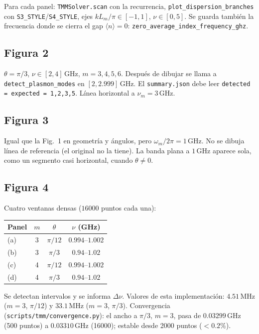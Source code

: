 \documentclass[11pt,a4paper]{article}
\begin{document}
Para cada panel: \texttt{TMMSolver.scan} con la recurrencia,
\texttt{plot\_dispersion\_branches} con \texttt{S3\_STYLE}/\texttt{S4\_STYLE},
ejes \(k L_m/\pi\in[-1,1]\), \(\nu\in[0,5]\).
Se guarda también la frecuencia donde se cierra el gap \(\langle n\rangle=0\):
\texttt{zero\_average\_index\_frequency\_ghz}.

\subsection{Figura 2}

\(\theta=\pi/3\), \(\nu\in[2,4]\,\mathrm{GHz}\), \(m=3,4,5,6\).
Después de dibujar se llama a \texttt{detect\_plasmon\_modes} en
\([2,2.999]\,\mathrm{GHz}\).
El \texttt{summary.json} debe leer \texttt{detected = expected = 1,2,3,5}.
Línea horizontal a \(\nu_m=3\,\mathrm{GHz}\).

\subsection{Figura 3}

Igual que la Fig.~1 en geometría y ángulos, pero
\(\omega_m/2\pi=1\,\mathrm{GHz}\).
No se dibuja línea de referencia (el original no la tiene).
La banda plana a \(1\,\mathrm{GHz}\) aparece sola, como un segmento casi
horizontal, cuando \(\theta\neq 0\).

\subsection{Figura 4}

Cuatro ventanas densas (\(16000\) puntos cada una):

\begin{center}
\begin{tabular}{lccc}
\toprule
Panel & \(m\) & \(\theta\) & \(\nu\) (GHz) \\
\midrule
(a) & 3 & \(\pi/12\) & \(0.994\)--\(1.002\) \\
(b) & 3 & \(\pi/3\) & \(0.94\)--\(1.02\) \\
(c) & 4 & \(\pi/12\) & \(0.994\)--\(1.002\) \\
(d) & 4 & \(\pi/3\) & \(0.94\)--\(1.02\) \\
\bottomrule
\end{tabular}
\end{center}

Se detectan intervalos y se informa \(\Delta\nu\).
Valores de esta implementación: \(4.51\,\mathrm{MHz}\) (\(m=3\), \(\pi/12\))
y \(33.1\,\mathrm{MHz}\) (\(m=3\), \(\pi/3\)).
Convergencia (\texttt{scripts/tmm/convergence.py}): el ancho a
\(\pi/3\), \(m=3\), pasa de \(0.03299\,\mathrm{GHz}\) (500 puntos) a
\(0.03310\,\mathrm{GHz}\) (16000); estable desde 2000 puntos (\(<0.2\%\)).
\end{document}
